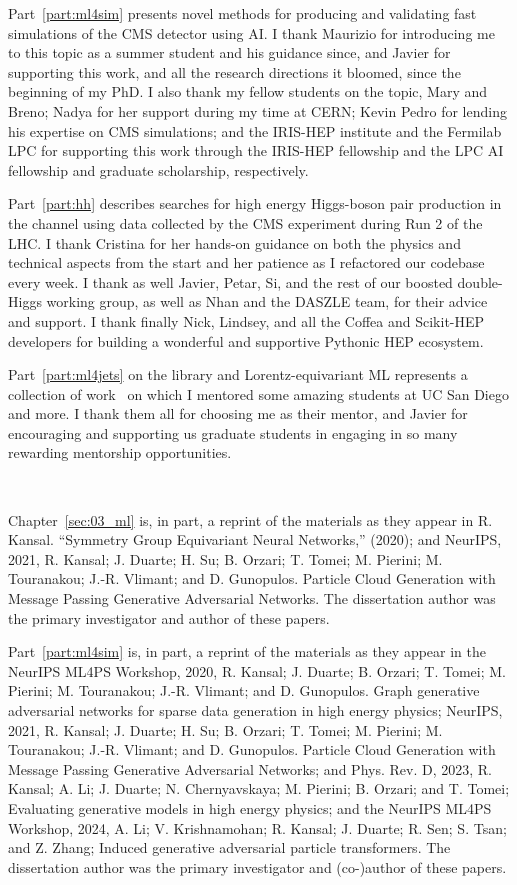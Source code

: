 Part~\ref{part:ml4sim} presents novel methods for producing and validating fast simulations of the CMS detector using AI.
I thank Maurizio for introducing me to this topic as a summer student and his guidance since, and Javier for supporting this work, and all the research directions it bloomed, since the beginning of my PhD.
I also thank my fellow students on the topic, Mary and Breno; Nadya for her support during my time at CERN; Kevin Pedro for lending his expertise on CMS simulations; and the IRIS-HEP institute and the Fermilab LPC for supporting this work through the IRIS-HEP fellowship and the LPC AI fellowship and graduate scholarship, respectively.

Part~\ref{part:hh} describes searches for high energy Higgs-boson pair production in the \bbvv channel using data collected by the CMS experiment during Run 2 of the LHC.
I thank Cristina for her hands-on guidance on both the physics and technical aspects from the start and her patience as I refactored our codebase every week.
I thank as well Javier, Petar, Si, and the rest of our boosted double-Higgs working group, as well as Nhan and the DASZLE team, for their advice and support.
I thank finally Nick, Lindsey, and all the Coffea and Scikit-HEP developers for building a wonderful and supportive Pythonic HEP ecosystem.

Part~\ref{part:ml4jets} on the \jetnet library and Lorentz-equivariant ML represents a collection of work~\cite{Kansal:2023iqy, Tsan:2021brw, Hao:2022zns} on which I mentored some amazing students at UC San Diego and more.
I thank them all
for choosing me as their mentor, and Javier for encouraging and supporting us graduate students in engaging in so many rewarding mentorship opportunities. 

\

Chapter~\ref{sec:03_ml} is, in part, a reprint of the materials as they appear in
R. Kansal. ``Symmetry Group Equivariant Neural Networks,'' (2020);
and
NeurIPS, 2021, R. Kansal; J. Duarte; H. Su; B. Orzari; T. Tomei; M. Pierini; M. Touranakou; J.-R. Vlimant; and D. Gunopulos. Particle Cloud Generation with Message Passing Generative Adversarial Networks.
The dissertation author was the primary investigator and author of these papers.

Part~\ref{part:ml4sim} is, in part, a reprint of the materials as they appear in 
the NeurIPS ML4PS Workshop, 2020, R. Kansal; J. Duarte; B. Orzari; T. Tomei; M. Pierini; M. Touranakou; J.-R. Vlimant; and D. Gunopulos. Graph generative adversarial networks for sparse data generation in high energy physics;
NeurIPS, 2021, R. Kansal; J. Duarte; H. Su; B. Orzari; T. Tomei; M. Pierini; M. Touranakou; J.-R. Vlimant; and D. Gunopulos. Particle Cloud Generation with Message Passing Generative Adversarial Networks; and
Phys. Rev. D, 2023, R. Kansal; A. Li; J. Duarte; N. Chernyavskaya; M. Pierini; B. Orzari; and T. Tomei; Evaluating generative models in high energy physics; and
the NeurIPS ML4PS Workshop, 2024, A. Li; V. Krishnamohan; R. Kansal; J. Duarte; R. Sen; S. Tsan; and Z. Zhang; Induced generative adversarial particle transformers.
The dissertation author was the primary investigator and (co-)author of these papers.

